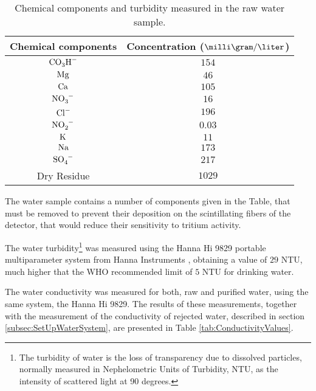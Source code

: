 \begin{table}[htbp]
\begin{center}
\begin{tabular}{|c|c|}
\hline
Chemical components & Concentration ($\milli\gram/\liter$)\\
\hline \hline \hline
$\ce{CO_{3}H^-}$ & $154$ \\ \hline
$\ce{Mg}$ & $46$ \\ \hline
$\ce{Ca}$ & $105$ \\ \hline
$\ce{NO_{3}^-}$ & $16$ \\ \hline
$\ce{Cl^-}$ & $196$ \\ \hline
$\ce{NO_{2}^-}$ & $0.03$ \\ \hline
$\ce{K}$ & $11$ \\ \hline
$\ce{Na}$ & $173$ \\ \hline
$\ce{SO_{4}^-}$ & $217$ \\ \hline
Dry Residue & $1029$ \\ \hline
\end{tabular}
\caption{Chemical components and turbidity measured in the raw water sample.}
\label{tab:ChemicalComponentsRawWater}
\end{center}
\end{table}

The water sample contains a number of components given in the Table, that must be removed to prevent their deposition on the scintillating fibers of the detector, that would reduce their sensitivity to tritium activity.

The water turbidity\footnote{The turbidity of water is the loss of transparency due to dissolved particles, normally measured in Nephelometric Units of Turbidity, NTU, as the intensity of scattered light at 90 degrees.} was measured using the Hanna Hi 9829 portable multiparameter system from Hanna Instruments \cite{TurbiditySystem}, obtaining a value of $29$ NTU, much higher that the WHO recommended limit of $5$ NTU for drinking water.

The water conductivity was measured for both, raw and purified water, using the same system, the Hanna Hi 9829. The results of these measurements, together with the measurement of the conductivity of rejected water, described in section \ref{subsec:SetUpWaterSystem}, are presented in Table \ref{tab:ConductivityValues}.

